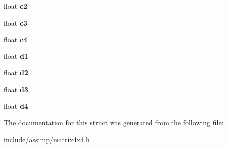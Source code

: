 \begin{DoxyCompactItemize}
\item 
\hypertarget{structaiMatrix4x4_a67425f81054b1097c29b73bf317cfeeb}{float {\bfseries c2}}\label{structaiMatrix4x4_a67425f81054b1097c29b73bf317cfeeb}

\item 
\hypertarget{structaiMatrix4x4_aec8c5745b90139d472eb4e91f1373c1a}{float {\bfseries c3}}\label{structaiMatrix4x4_aec8c5745b90139d472eb4e91f1373c1a}

\item 
\hypertarget{structaiMatrix4x4_a7e3288f38a4e00d55c02272e1582e462}{float {\bfseries c4}}\label{structaiMatrix4x4_a7e3288f38a4e00d55c02272e1582e462}

\item 
\hypertarget{structaiMatrix4x4_a13f3800d9106e3be6d0e60b794c5a5ae}{float {\bfseries d1}}\label{structaiMatrix4x4_a13f3800d9106e3be6d0e60b794c5a5ae}

\item 
\hypertarget{structaiMatrix4x4_a6f17ca1c7e4b9377d0e332f85aab282b}{float {\bfseries d2}}\label{structaiMatrix4x4_a6f17ca1c7e4b9377d0e332f85aab282b}

\item 
\hypertarget{structaiMatrix4x4_a8d2910f62b34b1e2ace93b55e4db4b92}{float {\bfseries d3}}\label{structaiMatrix4x4_a8d2910f62b34b1e2ace93b55e4db4b92}

\item 
\hypertarget{structaiMatrix4x4_ac0a65b51f126f7331b4f7dbbd82f3d63}{float {\bfseries d4}}\label{structaiMatrix4x4_ac0a65b51f126f7331b4f7dbbd82f3d63}

\end{DoxyCompactItemize}


\-The documentation for this struct was generated from the following file\-:\begin{DoxyCompactItemize}
\item 
include/assimp/\hyperlink{matrix4x4_8h}{matrix4x4.\-h}\end{DoxyCompactItemize}
